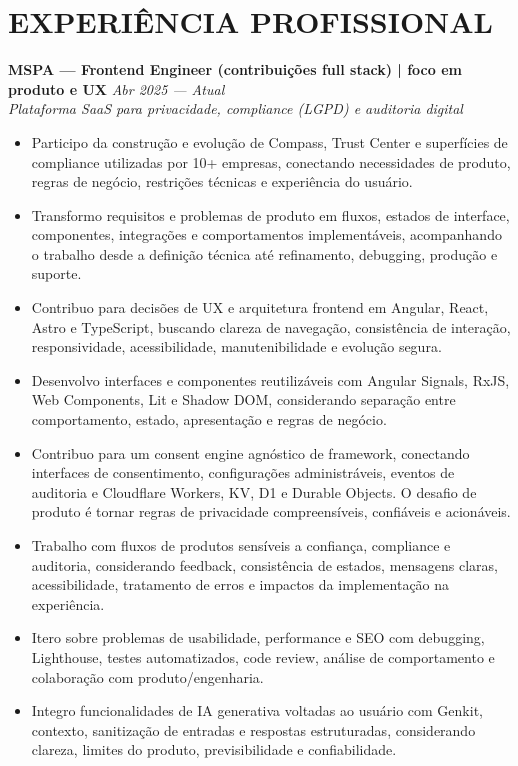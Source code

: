 \documentclass[10pt,a4paper]{article}
\begin{document}
\section*{EXPERIÊNCIA PROFISSIONAL}
\textbf{MSPA — Frontend Engineer (contribuições full stack) | foco em produto e UX} \hfill \textit{Abr 2025 — Atual}\\
\textit{Plataforma SaaS para privacidade, compliance (LGPD) e auditoria digital}
\begin{itemize}
\item Participo da construção e evolução de Compass, Trust Center e superfícies de compliance utilizadas por 10+ empresas, conectando necessidades de produto, regras de negócio, restrições técnicas e experiência do usuário.
\item Transformo requisitos e problemas de produto em fluxos, estados de interface, componentes, integrações e comportamentos implementáveis, acompanhando o trabalho desde a definição técnica até refinamento, debugging, produção e suporte.
\item Contribuo para decisões de UX e arquitetura frontend em Angular, React, Astro e TypeScript, buscando clareza de navegação, consistência de interação, responsividade, acessibilidade, manutenibilidade e evolução segura.
\item Desenvolvo interfaces e componentes reutilizáveis com Angular Signals, RxJS, Web Components, Lit e Shadow DOM, considerando separação entre comportamento, estado, apresentação e regras de negócio.
\item Contribuo para um consent engine agnóstico de framework, conectando interfaces de consentimento, configurações administráveis, eventos de auditoria e Cloudflare Workers, KV, D1 e Durable Objects. O desafio de produto é tornar regras de privacidade compreensíveis, confiáveis e acionáveis.
\item Trabalho com fluxos de produtos sensíveis a confiança, compliance e auditoria, considerando feedback, consistência de estados, mensagens claras, acessibilidade, tratamento de erros e impactos da implementação na experiência.
\item Itero sobre problemas de usabilidade, performance e SEO com debugging, Lighthouse, testes automatizados, code review, análise de comportamento e colaboração com produto/engenharia.
\item Integro funcionalidades de IA generativa voltadas ao usuário com Genkit, contexto, sanitização de entradas e respostas estruturadas, considerando clareza, limites do produto, previsibilidade e confiabilidade.

\end{itemize}
\end{document}
